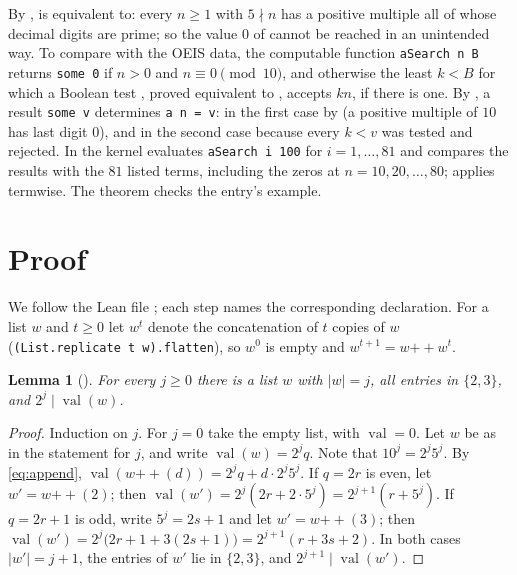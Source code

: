 \documentclass[11pt]{amsart}
\theoremstyle{plain}
\newtheorem{lemma}[theorem]{Lemma}
\theoremstyle{definition}
\newcommand{\val}{\operatorname{val}}
\begin{document}
By ,  is equivalent to: every $n\ge1$ with $5\nmid n$ has a positive multiple all of whose decimal digits are prime; so the value $0$ of  cannot be reached in an unintended way. To compare  with the OEIS data, the computable function \texttt{aSearch n B} returns \texttt{some 0} if $n>0$ and $n\equiv0\pmod{10}$, and otherwise the least $k<B$ for which a Boolean test , proved equivalent to , accepts $kn$, if there is one. By , a result \texttt{some v} determines \texttt{a n = v}: in the first case by  (a positive multiple of $10$ has last digit $0$), and in the second case because every $k<v$ was tested and rejected. In  the kernel evaluates \texttt{aSearch i 100} for $i=1,\dots,81$ and compares the results with the $81$ listed terms, including the zeros at $n=10,20,\dots,80$;  applies  termwise. The theorem  checks the entry's example.

\section{Proof}\label{sec:proof}

We follow the Lean file ; each step names the corresponding declaration. For a list $w$ and $t\ge0$ let $w^{t}$ denote the concatenation of $t$ copies of $w$ (\texttt{(List.replicate t w).flatten}), so $w^0$ is empty and $w^{t+1}=w\mathbin{+\!\!+}w^{t}$.

\begin{lemma}[]\label{lem:block}
For every $j\ge0$ there is a list $w$ with $|w|=j$, all entries in $\{2,3\}$, and $2^j\mid\val(w)$.
\end{lemma}

\begin{proof}
Induction on $j$. For $j=0$ take the empty list, with $\val=0$. Let $w$ be as in the statement for $j$, and write $\val(w)=2^jq$. Note that $10^j=2^j5^j$. By \eqref{eq:append}, $\val(w\mathbin{+\!\!+}(d))=2^jq+d\cdot2^j5^j$.
If $q=2r$ is even, let $w'=w\mathbin{+\!\!+}(2)$; then $\val(w')=2^j(2r+2\cdot5^j)=2^{j+1}(r+5^j)$.
If $q=2r+1$ is odd, write $5^j=2s+1$ and let $w'=w\mathbin{+\!\!+}(3)$; then $\val(w')=2^j\bigl(2r+1+3(2s+1)\bigr)=2^{j+1}(r+3s+2)$.
In both cases $|w'|=j+1$, the entries of $w'$ lie in $\{2,3\}$, and $2^{j+1}\mid\val(w')$.
\end{proof}
\end{document}
